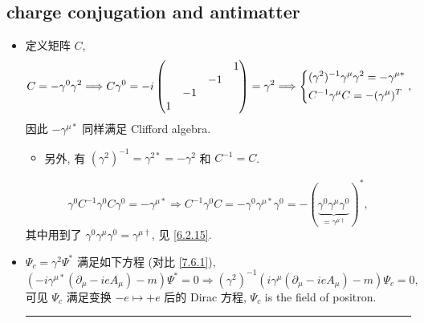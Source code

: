 \subsection{charge conjugation and antimatter}
\begin{itemize}
	\item 定义矩阵 $C$,
	\begin{equation}
		C = - \gamma^0 \gamma^2 \Longrightarrow C \gamma^0 = - i \begin{pmatrix}
			& & & 1 \\
			& & - 1 & \\
			& - 1 & & \\
			1 & & &
		\end{pmatrix} = \gamma^2 \Longrightarrow \begin{dcases}
			(\gamma^2)^{- 1} \gamma^\mu \gamma^2 = - \gamma^{\mu *} \\
			C^{- 1} \gamma^\mu C = - (\gamma^\mu)^T
		\end{dcases},
	\end{equation}
	因此 $- \gamma^{\mu *}$ 同样满足 Clifford algebra.
	\begin{itemize}
		\item 另外, 有 $(\gamma^2)^{- 1} = \gamma^{2 *} = - \gamma^2$ 和 $C^{- 1} = C$.
	\end{itemize}
	
	\begin{tcolorbox}[title=calculation:]
		\begin{equation}
			\gamma^0 C^{- 1} \gamma^0 C \gamma^0 = - \gamma^{\mu *} \Longrightarrow C^{- 1} \gamma^0 C = - \gamma^0 \gamma^{\mu *} \gamma^0 = - (\underbrace{\gamma^0 \gamma^\mu \gamma^0}_{= \gamma^{\mu \dag}})^*,
		\end{equation}
		其中用到了 $\gamma^0 \gamma^\mu \gamma^0 = \gamma^{\mu \dag}$, 见 \eqref{6.2.15}.
	\end{tcolorbox}
	
	\item $\Psi_c = \gamma^2 \Psi^*$ 满足如下方程 (对比 \eqref{7.6.1}),
	\begin{equation}
		(- i \gamma^{\mu *} (\partial_\mu - i e A_\mu) - m) \Psi^* = 0 \Longrightarrow (\gamma^2)^{- 1} (i \gamma^\mu (\partial_\mu - i e A_\mu) - m) \Psi_c = 0,
	\end{equation}
	可见 $\Psi_c$ 满足变换 $- e \mapsto + e$ 后的 Dirac 方程, $\Psi_c$ is the field of positron.
	
	\noindent\rule[0.5ex]{\linewidth}{0.5pt} %
	

\end{itemize}
